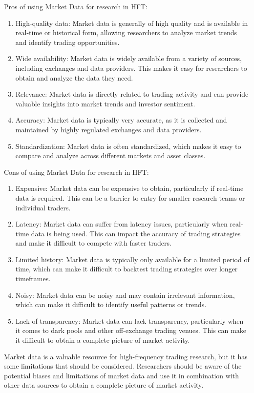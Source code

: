 \documentclass{article}
\begin{document}
Pros of using Market Data for research in HFT:
\begin{enumerate}
	\item High-quality data: Market data is generally of high quality and is available in real-time or historical form, allowing researchers to analyze market trends and identify trading opportunities.
	\item Wide availability: Market data is widely available from a variety of sources, including exchanges and data providers. This makes it easy for researchers to obtain and analyze the data they need.
	\item Relevance: Market data is directly related to trading activity and can provide valuable insights into market trends and investor sentiment.
	\item Accuracy: Market data is typically very accurate, as it is collected and maintained by highly regulated exchanges and data providers.
	\item Standardization: Market data is often standardized, which makes it easy to compare and analyze across different markets and asset classes.
\end{enumerate}
Cons of using Market Data for research in HFT:
\begin{enumerate}
	\item Expensive: Market data can be expensive to obtain, particularly if real-time data is required. This can be a barrier to entry for smaller research teams or individual traders.
	\item Latency: Market data can suffer from latency issues, particularly when real-time data is being used. This can impact the accuracy of trading strategies and make it difficult to compete with faster traders.
	\item Limited history: Market data is typically only available for a limited period of time, which can make it difficult to backtest trading strategies over longer timeframes.
	\item Noisy: Market data can be noisy and may contain irrelevant information, which can make it difficult to identify useful patterns or trends.
	\item Lack of transparency: Market data can lack transparency, particularly when it comes to dark pools and other off-exchange trading venues. This can make it difficult to obtain a complete picture of market activity.
\end{enumerate}
Market data is a valuable resource for high-frequency trading research, but it has some limitations that should be considered. 
Researchers should be aware of the potential biases 
and limitations of market data and use it in combination with other data sources to obtain a complete picture of market activity.
\end{document}
